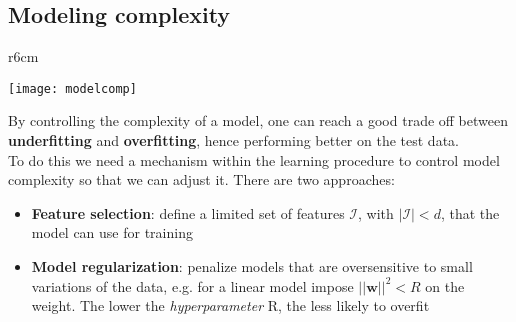 \subsection{Modeling complexity}
\begin{wrapfigure}[7]{r}{6cm}
	\vspace{-.9cm}
	\begin{center}
		\texttt{[image: modelcomp]}
	\end{center}
\end{wrapfigure}
By controlling the complexity of a model, one can reach a good trade off between \textbf{underfitting} and \textbf{overfitting}, hence performing better on the test data.\\

To do this we need a mechanism within the learning procedure to control model complexity so that we can adjust it. There are two approaches:
\begin{itemize}
	\item \textbf{Feature selection}: define a limited set of features $\mathcal{I}$, with $\lvert\mathcal{I}\rvert < d$, that the model can use for training
	\item \textbf{Model regularization}: penalize models that are oversensitive to small variations of the data, e.g. for a linear model impose $\lvert\lvert \mathbf{w}\rvert\rvert^2 < R$ on the weight. The lower the \textit{hyperparameter} R, the less likely to overfit
\end{itemize}

